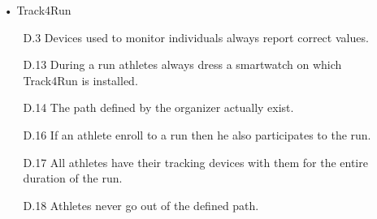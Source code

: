 \begin{enumerate}
\item[•] {\Large Track4Run}
	\begin{enumerate}
	\item [D.3] Devices used to monitor individuals always report correct values.
	\item [D.13] During a run athletes always dress a smartwatch on which Track4Run is installed.
	\item [D.14] The path defined by the organizer actually exist.
    \item [D.16] If an athlete enroll to a run then he also participates to the run.
    \item [D.17] All athletes have their tracking devices with them for the entire duration of the run.
    \item [D.18] Athletes never go out of the defined path.
	\end{enumerate}
\end{enumerate}